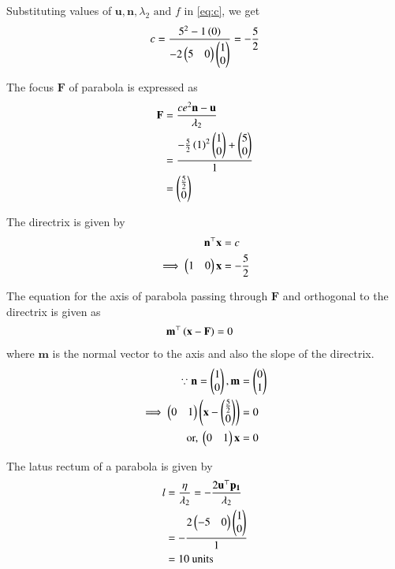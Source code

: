 \documentclass[journal,12pt,twocolumn]{IEEEtran}
\renewcommand{\vec}[1]{\boldsymbol{\mathbf{#1}}}
\begin{document}
Substituting values of $\vec{u}, \vec{n}, \lambda_2 \text{ and } f$ in \eqref{eq:c}, we get
\begin{align}
	c &= \frac{5^2-1\left(0\right)}{-2 \begin{pmatrix}5 & 0\end{pmatrix}\begin{pmatrix}1 \\ 0\end{pmatrix}} = -\frac{5}{2} \\
\end{align}

The focus $\vec{F}$ of parabola is expressed as
\begin{align}
	\vec{F} &= \frac{ce^2\vec{n}-\vec{u}}{\lambda_2} \\
	&= \frac{-\frac{5}{2}\brak{1}^2\myvec{1 \\0} + \myvec{5 \\ 0}}{1} \\
	&= \myvec{\frac{5}{2} \\ 0}
\end{align}

The directrix is given by
\begin{align}
	\vec{n}^\top\vec{x} &= c \\
\implies	\myvec{1 & 0}\vec{x} &= -\frac{5}{2} \\
\end{align}

The equation for the axis of parabola passing through $\vec{F}$ and orthogonal to the directrix is given as  
\begin{align}
	\vec{m}^\top\brak{\vec{x}-\vec{F}} &= 0
\end{align}
where $\vec{m}$ is the normal vector to the axis and also the slope of the directrix.
\begin{align}
	\because \vec{n} = \myvec{1 \\ 0 }, \vec{m} &= \myvec{0 \\ 1} \\
	\implies \myvec{0 & 1}\myvec{\vec{x} - \myvec{\frac{5}{2} \\ 0}} &= 0\\
	\text{or, }	\myvec{0 & 1}\vec{x} &= 0 
\end{align}

The latus rectum of a parabola is given by 
\begin{align}
	l &= \frac{\eta}{\lambda_2}  
	 = -\frac{2\vec{u}^\top\vec{p_1}}{\lambda_2} \\
	 &= -\frac{2\myvec{-5 & 0}\myvec{1 \\ 0}}{1} \\
	 &= 10 \text{ units }
\end{align}
\end{document}
